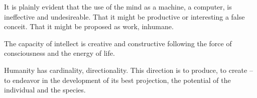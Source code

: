 

It is plainly evident that the use of the mind as a machine, a
computer, is ineffective and undesireable.  That it might be
productive or interesting a false conceit.  That it might be proposed
as work, inhumane.  

The capacity of intellect is creative and constructive following the
force of consciousness and the energy of life.  

Humanity has cardinality, directionality.  This direction is to
produce, to create -- to endeavor in the development of its best
projection, the potential of the individual and the species.

\bye
